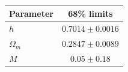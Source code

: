 \begin{tabular} { l  c}

 Parameter &  68\% limits\\
\hline
{\boldmath$h              $} & $0.7014\pm 0.0016          $\\

{\boldmath$Ω_m            $} & $0.2847\pm 0.0089          $\\

{\boldmath$M              $} & $0.05\pm 0.18              $\\
\hline
\end{tabular}